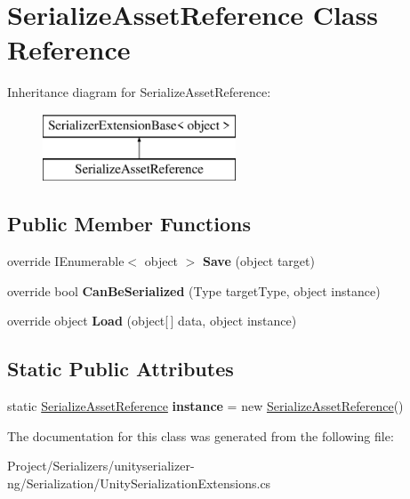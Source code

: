 \hypertarget{class_serialize_asset_reference}{}\section{Serialize\+Asset\+Reference Class Reference}
\label{class_serialize_asset_reference}
Inheritance diagram for Serialize\+Asset\+Reference\+:\begin{figure}[H]
\begin{center}
\leavevmode
\includegraphics[height=2.000000cm]{class_serialize_asset_reference}
\end{center}
\end{figure}
\subsection*{Public Member Functions}
\begin{DoxyCompactItemize}
\item 
\mbox{\label{class_serialize_asset_reference_af5e17876467e84231b3c7925871b1978}} 
override I\+Enumerable$<$ object $>$ {\bfseries Save} (object target)
\item 
\mbox{\label{class_serialize_asset_reference_a5ea84d0ce141e942750d2b4d33e89d08}} 
override bool {\bfseries Can\+Be\+Serialized} (Type target\+Type, object instance)
\item 
\mbox{\label{class_serialize_asset_reference_ab37514eab05ceebd554e33646c8e058a}} 
override object {\bfseries Load} (object\mbox{[}$\,$\mbox{]} data, object instance)
\end{DoxyCompactItemize}
\subsection*{Static Public Attributes}
\begin{DoxyCompactItemize}
\item 
\mbox{\label{class_serialize_asset_reference_ad34320b9b2fc2e39a5c4e8addb07e5ec}} 
static \hyperlink{class_serialize_asset_reference}{Serialize\+Asset\+Reference} {\bfseries instance} = new \hyperlink{class_serialize_asset_reference}{Serialize\+Asset\+Reference}()
\end{DoxyCompactItemize}


The documentation for this class was generated from the following file\+:\begin{DoxyCompactItemize}
\item 
Project/\+Serializers/unityserializer-\/ng/\+Serialization/Unity\+Serialization\+Extensions.\+cs\end{DoxyCompactItemize}
